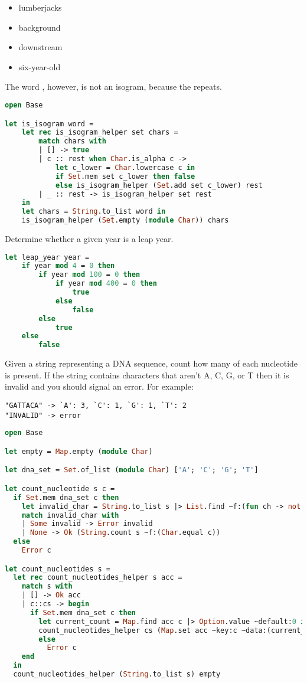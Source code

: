 \begin{itemize}
  \item lumberjacks
  \item background
  \item downstream
  \item six-year-old
\end{itemize}
The word , however, is not an isogram, because the  repeats.

\begin{lstlisting}[language=OCaml]
open Base

let is_isogram word =
    let rec is_isogram_helper set chars =
        match chars with
        | [] -> true
        | c :: rest when Char.is_alpha c ->
            let c_lower = Char.lowercase c in
            if Set.mem set c_lower then false
            else is_isogram_helper (Set.add set c_lower) rest
        | _ :: rest -> is_isogram_helper set rest
    in
    let chars = String.to_list word in
    is_isogram_helper (Set.empty (module Char)) chars
\end{lstlisting}

\problem[Leap]
Determine whether a given year is a leap year.

\begin{lstlisting}[language=OCaml]
let leap_year year =
    if year mod 4 = 0 then
        if year mod 100 = 0 then
            if year mod 400 = 0 then
                true
            else
                false
        else
            true
    else
        false
\end{lstlisting}

Given a string representing a DNA sequence, count how many of each nucleotide is present.
If the string contains characters that aren't A, C, G, or T then it is invalid and you should signal an error.
For example:
\begin{verbatim}
"GATTACA" -> `A': 3, `C': 1, `G': 1, `T': 2
"INVALID" -> error
\end{verbatim}

\begin{lstlisting}[language=OCaml]
open Base

let empty = Map.empty (module Char)

let dna_set = Set.of_list (module Char) ['A'; 'C'; 'G'; 'T']

let count_nucleotide s c =
  if Set.mem dna_set c then
    let invalid_char = String.to_list s |> List.find ~f:(fun ch -> not (Set.mem dna_set ch)) in
    match invalid_char with
    | Some invalid -> Error invalid
    | None -> Ok (String.count s ~f:(Char.equal c))
  else
    Error c

let count_nucleotides s =
  let rec count_nucleotides_helper s acc =
    match s with
    | [] -> Ok acc
    | c::cs -> begin
      if Set.mem dna_set c then
        let current_count = Map.find acc c |> Option.value ~default:0 in
        count_nucleotides_helper cs (Map.set acc ~key:c ~data:(current_count + 1))
        else
          Error c
    end
  in
  count_nucleotides_helper (String.to_list s) empty
\end{lstlisting}

